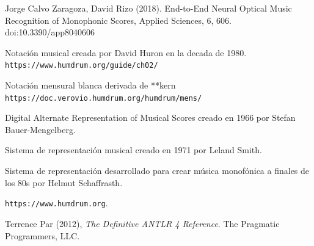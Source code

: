 \documentclass{article}
\begin{document}
\begin{thebibliography}{9}
    Jorge Calvo Zaragoza, David Rizo (2018). End-to-End Neural Optical Music Recognition of Monophonic Scores, Applied Sciences, 6, 606. doi:10.3390/app8040606

    Notación musical creada por David Huron en la decada de 1980.
    \texttt{https://www.humdrum.org/guide/ch02/}

    Notación mensural blanca derivada de **kern
    \texttt{https://doc.verovio.humdrum.org/humdrum/mens/}

    Digital Alternate Representation of Musical Scores creado en 1966 por Stefan Bauer-Mengelberg.

    Sistema de representación musical creado en 1971 por Leland Smith.

    Sistema de representación desarrollado para crear música monofónica a finales de los 80s por Helmut Schaffrasth.

    \texttt{https://www.humdrum.org}.

    Terrence Par (2012), \textit{The Definitive ANTLR 4 Reference}. The Pragmatic Programmers, LLC.



\end{thebibliography}
\end{document}
